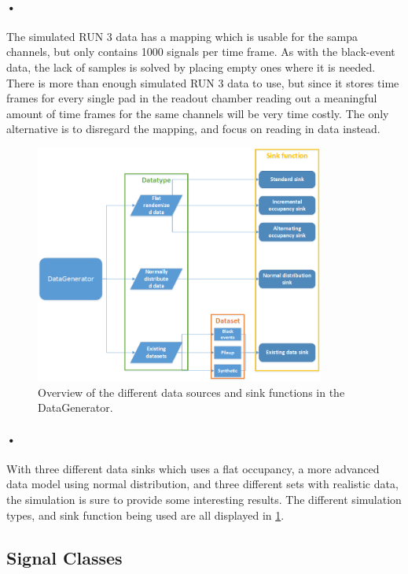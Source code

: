 \documentclass[a4paper, 12pt, openright, twoside]{report}
\begin{document}
\paragraph{•}
The simulated RUN 3 data has a mapping which is usable for the \gls{sampa} channels, but only contains 1000 signals per time frame.
As with the black-event data, the lack of samples is solved by placing empty ones where it is needed.
There is more than enough simulated RUN 3 data to use, but since it stores time frames for every single pad in the readout chamber reading out a meaningful amount of time frames for the same channels will be very time costly.
The only alternative is to disregard the mapping, and focus on reading in data instead.

\begin{figure}[h!]
	\centering
		\includegraphics[width=0.85\textwidth]{images/dg-overview.png}
		\caption{Overview of the different data sources and sink functions in the DataGenerator.}
		\label{fig:dg-overview}
\end{figure}

\paragraph{•}
With three different data sinks which uses a flat occupancy, a more advanced data model using normal distribution, and three different sets with realistic data, the simulation is sure to provide some interesting results.
The different simulation types, and sink function being used are all displayed in \ref{fig:dg-overview}.

\subsection{Signal Classes}
\label{subsec:signal-classes}
\end{document}
